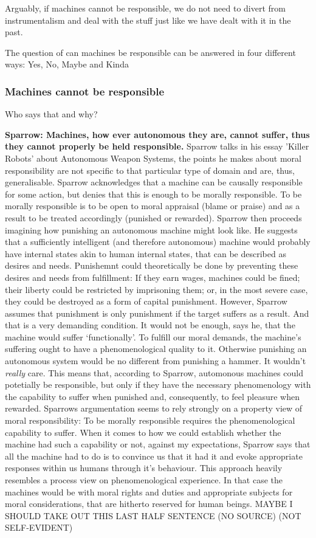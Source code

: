 \documentclass{article}
\begin{document}
Arguably, if machines cannot be responsible, we do not need to divert from
instrumentalism and deal with the stuff just like we have dealt with it in the
past.

The question of can machines be responsible can be answered in four different
ways: Yes, No, Maybe and Kinda
\newpage

\subsubsection{Machines cannot be responsible}
Who says that and why?

\textbf{Sparrow: Machines, how ever autonomous they are, cannot suffer, thus they cannot
properly be held responsible.}
Sparrow talks in his essay 'Killer Robots' about Autonomous Weapon Systems, the
points he makes about moral responsibility are not specific to that particular
type of domain and are, thus, generalisable. Sparrow acknowledges that a machine
can be causally responsible for some action, but denies that this is enough to
be morally responsible. To be morally responsible is to be open to moral appraisal
(blame or praise) and as a result to be treated accordingly (punished or
rewarded). Sparrow then proceeds imagining how punishing an autonomous machine
might look like. He suggests that a sufficiently intelligent (and therefore
autonomous) machine would probably have internal states akin to human internal
states, that can be described as desires and needs. Punishemnt could
theoretically be done by preventing these desires and needs from fulfillment: If
they earn wages, machines could be fined; their liberty could be restricted by
imprisoning them; or, in the most severe case, they could be destroyed as a form
of capital punishment. However, Sparrow assumes that punishment is only
punishment if the target suffers as a result. And that is a very demanding
condition. It would not be enough, says he, that the machine would suffer
`functionally'. To fulfill our moral demands, the machine's suffering ought to
have a phenomenological quality to it. Otherwise punishing an autonomous system
would be no different from punishing a hammer. It wouldn't \textit{really} care.
This means that, according to Sparrow, automonous machines could potetially be
responsible, but only if they have the necessary phenomenology with the
capability to suffer when punished and, consequently, to feel pleasure when
rewarded. Sparrows argumentation seems to rely strongly on a property view of moral
responsibility: To be morally responsible requires the phenomenological
capability to suffer. When it comes to how we could establish whether the
machine had such a capability or not, against my expectations, Sparrow says that
all the machine had to do is to convince us that it had it and evoke appropriate
responses within us humans through it's behaviour. This approach heavily
resembles a process view on phenomenological experience. In that case the
machines would be  with moral rights and duties and
appropriate subjects for moral considerations, that are hitherto reserved for
human beings. MAYBE I SHOULD TAKE OUT THIS LAST HALF SENTENCE (NO SOURCE) (NOT
SELF-EVIDENT)
\end{document}
